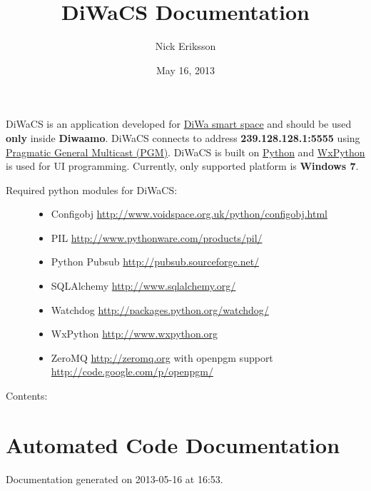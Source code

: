 \documentclass[letterpaper,10pt,english]{sphinxmanual}
\title{DiWaCS Documentation}
\date{May 16, 2013}
\author{Nick Eriksson}
\begin{document}
\maketitle
\tableofcontents
{}\label{index::doc}


DiWaCS is an application developed for \href{https://cse.aalto.fi/research/groups/stratus/research/research-projects/}{DiWa smart space} and should be used \textbf{only} inside \textbf{Diwaamo}. DiWaCS connects to address \textbf{239.128.128.1:5555} using \href{http://code.google.com/p/openpgm/}{Pragmatic General Multicast (PGM)}. DiWaCS is built on \href{http://www.python.org}{Python} and \href{http://www.wxpython.org}{WxPython} is used for UI programming. Currently, only supported platform is \textbf{Windows 7}.
\begin{description}
\item[{Required python modules for DiWaCS:}] \leavevmode\begin{itemize}
\item {} 
Configobj \href{http://www.voidspace.org.uk/python/configobj.html}{http://www.voidspace.org.uk/python/configobj.html}

\item {} 
PIL \href{http://www.pythonware.com/products/pil/}{http://www.pythonware.com/products/pil/}

\item {} 
Python Pubsub \href{http://pubsub.sourceforge.net/}{http://pubsub.sourceforge.net/}

\item {} 
SQLAlchemy \href{http://www.sqlalchemy.org/}{http://www.sqlalchemy.org/}

\item {} 
Watchdog  \href{http://packages.python.org/watchdog/}{http://packages.python.org/watchdog/}

\item {} 
WxPython \href{http://www.wxpython.org}{http://www.wxpython.org}

\item {} 
ZeroMQ \href{http://zeromq.org}{http://zeromq.org} with openpgm support \href{http://code.google.com/p/openpgm/}{http://code.google.com/p/openpgm/}

\end{itemize}

\end{description}

Contents:


\chapter{Automated Code Documentation}
\label{api:automated-code-documentation}\label{api::doc}\label{api:welcome-to-diwacs-documentation}
Documentation generated on 2013-05-16 at 16:53.
\end{document}
